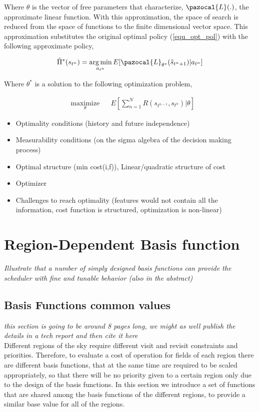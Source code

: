 \documentclass[12pt]{article}
\theoremstyle{definition}
\DeclareMathOperator*{\argmin}{arg\,min}
\begin{document}
Where $\theta$ is the vector of free parameters that characterize, $\pazocal{L}(.)$, the approximate linear function. With this approximation, the space of search is reduced from the space of functions to the finite dimensional vector space. This approximation substitutes the original optimal policy (\ref{equ_opt_pol}) with the following approximate policy,

\begin{equation*}\label{equ_approx_pol}
\tilde{\Pi}^*(s_{t^n}) = \argmin_{a_{t^n}} E[ \pazocal{L}_{\theta^*}(\tilde{s}_{t^n+1}) | a_{t^n}]
\end{equation*}

Where $\theta^*$ is a solution to the following optimization problem,

\begin{equation*}\label{equ_opt3}
\begin{aligned}
& \underset{\theta}{\text{maximize}}
& & E[\sum_{n=1}^{N} R(s_{t^{n-1}}, s_{t^n}) | \theta] 
\end{aligned}
\end{equation*}


\begin{itemize}
\item Optimality conditions (history and future independence)
\item Measurability conditions (on the sigma algebra of the decision making process)
\item Optimal structure (min cost(i,f)), Linear/quadratic structure of cost
\item Optimizer
\item Challenges to reach optimality (features would not contain all the information, cost function is structured, optimization is non-linear)
\end{itemize}


\section{Region-Dependent Basis function } \label{subsec-BF}
\textit{Illustrate that a number of simply designed basis functions can provide the scheduler with fine and tunable behavior (also in the abstract)}\\
\subsection{Basis Functions common values}
\textit{this section is going to be around 8 pages long, we might as well publish the details in a tech report and then cite it here}\\
Different regions of the sky require different visit and revisit constraints and priorities. Therefore, to evaluate a cost of operation for fields of each region there are different basis functions, that at the same time are required to be scaled appropriately, so that there will be no priority given to a certain region only due to the design of the basis functions. In this section we introduce a set of functions that are shared among the basis functions of the different regions, to provide a similar base value for all of the regions.
 
\end{document}
